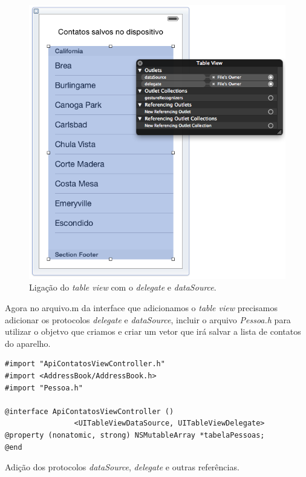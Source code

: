 \documentclass[a4paper,12pt,brazil,oneside]{book}
\begin{document}
\begin{figure}[H]
  \centering
  \includegraphics[totalheight=0.55\textheight]{figuras/4/api_contatos1.png}
  \caption{Ligação do \emph{table view} com o \emph{delegate} e \emph{dataSource}.}
  \label{fig:a}
\end{figure}

Agora no arquivo.m da interface que adicionamos o \emph{table view} precisamos adicionar os protocolos \emph{delegate} e \emph{dataSource}, incluir o arquivo \emph{Pessoa.h} para utilizar o objetvo que criamos e criar um vetor que irá salvar a lista de contatos do aparelho.

\begin{listing}[H]
\begin{verbatim}
#import "ApiContatosViewController.h"
#import <AddressBook/AddressBook.h>
#import "Pessoa.h"

@interface ApiContatosViewController () 
				<UITableViewDataSource, UITableViewDelegate>
@property (nonatomic, strong) NSMutableArray *tabelaPessoas;
@end
\end{verbatim}
\caption{Adição dos protocolos \emph{dataSource}, \emph{delegate} e outras referências.}
\end{listing}
\end{document}
